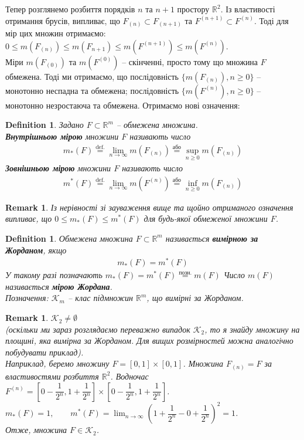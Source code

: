 \documentclass[a4paper, 10pt]{article}
\theoremstyle{theoremdd}
\theoremstyle{theoremdd}
\newtheorem{definition}[theorem]{Definition}
\theoremstyle{theoremdd}
\theoremstyle{theoremdd}
\theoremstyle{theoremdd}
\theoremstyle{theoremdd}
\newtheorem{remark}[theorem]{Remark}
\theoremstyle{theoremdd}
\theoremstyle{theoremdd}
\begin{document}
Тепер розглянемо розбиття порядків $n$ та $n+1$ простору $\mathbb{R}^2$. Із властивості отримання брусів, випливає, що $F_{(n)} \subset F_{(n+1)}$ та $F^{(n+1)} \subset F^{(n)}$. Тоді для мір цих множин отримаємо:\\
$0 \leq m(F_{(n)}) \leq m(F_{n+1}) \leq m(F^{(n+1)}) \leq m(F^{(n)})$.\\
Міри $m(F_{(0)})$ та $m(F^{(0)})$ -- скінченні, просто тому що множина $F$ обмежена. Тоді ми отримаємо, що послідовність $\{m(F_{(n)}), n \geq 0\}$ -- монотонно неспадна та обмежена; послідовність $\{m(F^{(n)}), n \geq 0\}$ -- монотонно незростаюча та обмежена. Отримаємо нові означення:

\begin{definition}
Задано $F \subset \mathbb{R}^m$ -- обмежена множина.\\
\textbf{Внутрішньою мірою} множини $F$ називають число
\begin{align*}
m_*(F) \overset{\text{def.}}{=} \lim_{n \to \infty} m(F_{(n)}) \overset{\text{або}}{=} \sup_{n \geq 0} m(F_{(n)})
\end{align*}
\textbf{Зовнішньою мірою} множини $F$ називають число
\begin{align*}
m^*(F) \overset{\text{def.}}{=} \lim_{n \to \infty} m(F^{(n)}) \overset{\text{або}}{=} \inf_{n \geq 0} m(F_{(n)})
\end{align*}
\end{definition}

\begin{remark}
Із нерівності зі зауваження вище та щойно отриманого означення випливає, що $0 \leq m_*(F) \leq m^*(F)$ для будь-якої обмеженої множини $F$.
\end{remark}

\begin{definition}
Обмежена множина $F \subset \mathbb{R}^m$ називається \textbf{вимірною за Жорданом}, якщо
\begin{align*}
m_*(F) = m^*(F)
\end{align*}
У такому разі позначають $m_*(F) = m^*(F) \overset{\text{позн.}}{=} m(F)$ Число $m(F)$ називається \textbf{мірою Жордана}.\\
Позначення: $\mathcal{K}_m$ -- клас підмножин $\mathbb{R}^m$, що вимірні за Жорданом.
\end{definition}

\begin{remark}
$\mathcal{K}_2 \neq \emptyset$ \\
\textit{(оскільки ми зараз розглядаємо переважно випадок $\mathcal{K}_2$, то я знайду множину на площині, яка вимірна за Жорданом. Для вищих розмірностей можна аналогічно побудувати приклад)}.\\
Наприклад, беремо множину $F = [0,1] \times [0,1]$. Множина $F_{(n)} = F$ за властивостями розбиття $\mathbb{R}^2$. Водночас $F^{(n)} = \left[ 0 - \dfrac{1}{2^n}, 1+\dfrac{1}{2^n} \right] \times \left[0 - \dfrac{1}{2^n}, 1+\dfrac{1}{2^n} \right]$.\\
$m_*(F) = 1, \qquad m^*(F) = \displaystyle\lim_{n \to \infty} \left( 1+\dfrac{1}{2^n} - 0 + \dfrac{1}{2^n} \right)^2 = 1$.\\
Отже, множина $F \in \mathcal{K}_2$.
\end{remark}
\end{document}
